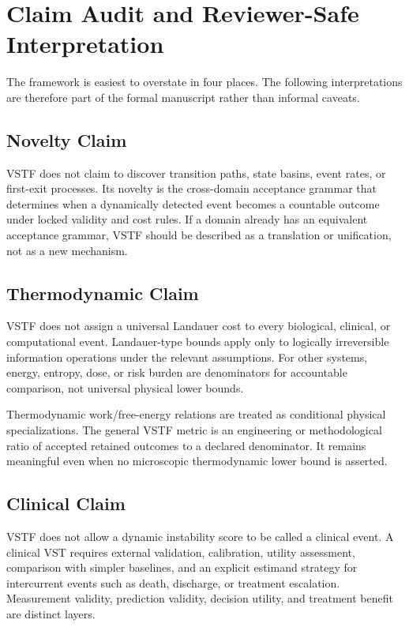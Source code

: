 \documentclass[11pt,a4paper]{article}
\newcommand{\1}{\mathbf{1}}
\begin{document}
\section{Claim Audit and Reviewer-Safe Interpretation}

The framework is easiest to overstate in four places. The following interpretations are therefore part of the formal manuscript rather than informal caveats.

\subsection{Novelty Claim}

VSTF does not claim to discover transition paths, state basins, event rates, or first-exit processes. Its novelty is the cross-domain acceptance grammar that determines when a dynamically detected event becomes a countable outcome under locked validity and cost rules. If a domain already has an equivalent acceptance grammar, VSTF should be described as a translation or unification, not as a new mechanism.

\subsection{Thermodynamic Claim}

VSTF does not assign a universal Landauer cost to every biological, clinical, or computational event. Landauer-type bounds apply only to logically irreversible information operations under the relevant assumptions. For other systems, energy, entropy, dose, or risk burden are denominators for accountable comparison, not universal physical lower bounds.

Thermodynamic work/free-energy relations are treated as conditional physical specializations. The general VSTF metric is an engineering or methodological ratio of accepted retained outcomes to a declared denominator. It remains meaningful even when no microscopic thermodynamic lower bound is asserted.

\subsection{Clinical Claim}

VSTF does not allow a dynamic instability score to be called a clinical event. A clinical VST requires external validation, calibration, utility assessment, comparison with simpler baselines, and an explicit estimand strategy for intercurrent events such as death, discharge, or treatment escalation. Measurement validity, prediction validity, decision utility, and treatment benefit are distinct layers.
\end{document}
